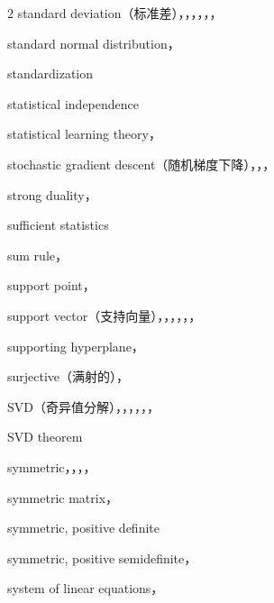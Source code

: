 \begin{multicols}{2}
\noindent standard deviation（标准差），，，，，，\par
\noindent standard normal distribution，\par
\noindent standardization\par
\noindent statistical independence\par
\noindent statistical learning theory，\par
\noindent stochastic gradient descent（随机梯度下降），，，\par
\noindent strong duality，\par
\noindent sufficient statistics\par
\noindent sum rule，\par
\noindent support point，\par
\noindent support vector（支持向量），，，，，，\par
\noindent supporting hyperplane，\par
\noindent surjective（满射的），\par
\noindent SVD（奇异值分解），，，，，，\par
\noindent SVD theorem\par
\noindent symmetric，，，，\par
\noindent symmetric matrix，\par
\noindent symmetric, positive definite\par
\noindent symmetric, positive semidefinite，\par
\noindent system of linear equations，\par


\end{multicols}

